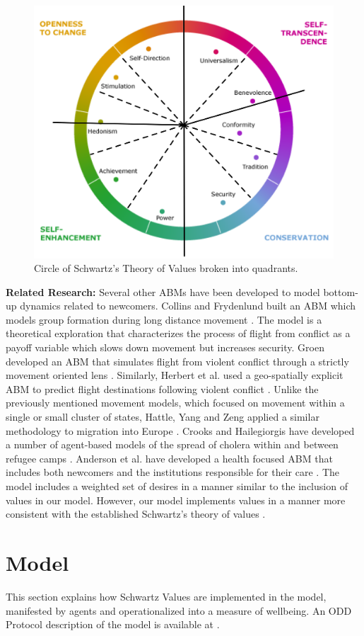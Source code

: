\documentclass{scspaperproc}
\theoremstyle{scsthe}
\begin{document}
\begin{figure}[htb]
{
\centering
\includegraphics[width=0.40\columnwidth]{Color-Value-Circle.png}
\caption{Circle of Schwartz's Theory of Values broken into quadrants.}
\label{fig:val-circle}
}
\end{figure}

{\bf Related Research:} Several other ABMs have been developed to model bottom-up dynamics related to newcomers. Collins and Frydenlund built an ABM which models group formation during long distance movement \cite{22}. The model is a theoretical exploration that characterizes the process of flight from conflict as a payoff variable which slows down movement but increases security. Groen developed an ABM that simulates flight from violent conflict through a strictly movement oriented lens \cite{37}. Similarly, Herbert et al. used a geo-spatially explicit ABM to predict flight destinations following violent conflict \cite{43}. Unlike the previously mentioned movement models, which focused on movement within a single or small cluster of states, Hattle, Yang and Zeng applied a similar methodology to migration into Europe \cite{42}. Crooks and Hailegiorgis have developed a number of agent-based models of the spread of cholera within and between refugee camps \cite{28,38}. Anderson et al. have developed a health focused ABM that includes both newcomers and the institutions responsible for their care \cite{4}. The model includes a weighted set of desires in a manner similar to the inclusion of values in our model. However, our model implements values in a manner more consistent with the established Schwartz's theory of values \cite{phil.masters.thesis}.

\section{Model}

This section explains how Schwartz Values are implemented in the model, manifested by agents and operationalized into a measure of wellbeing. An ODD Protocol description of the model is available at \cite{phil.masters.thesis}.
\end{document}
